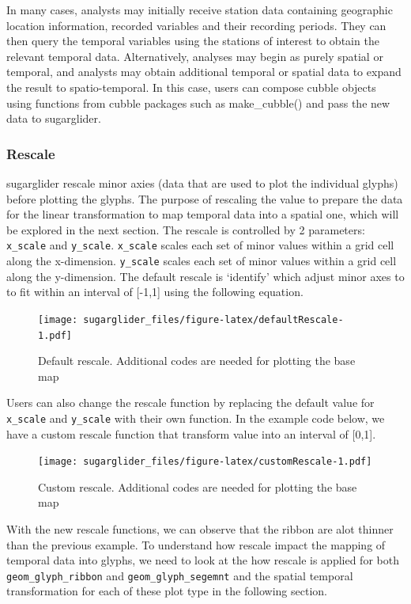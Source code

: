 In many cases, analysts may initially receive station data containing geographic location information, recorded variables and their recording periods. They can then query the temporal variables using the stations of interest to obtain the relevant temporal data. Alternatively, analyses may begin as purely spatial or temporal, and analysts may obtain additional temporal or spatial data to expand the result to spatio-temporal. In this case, users can compose cubble objects using functions from cubble packages such as make\_cubble() and pass the new data to sugarglider.

\hypertarget{rescale}{%
\subsubsection{Rescale}\label{rescale}}

sugarglider rescale minor axies (data that are used to plot the individual glyphs) before plotting the glyphs. The purpose of rescaling the value to prepare the data for the linear transformation to map temporal data into a spatial one, which will be explored in the next section. The rescale is controlled by 2 parameters: \texttt{x\_scale} and \texttt{y\_scale}. \texttt{x\_scale} scales each set of minor values within a grid cell along the x-dimension. \texttt{y\_scale} scales each set of minor values within a grid cell along the y-dimension. The default rescale is `identify' which adjust minor axes to to fit within an interval of {[}-1,1{]} using the following equation.

\begin{figure}
\centering
\texttt{[image: sugarglider\_files/figure-latex/defaultRescale-1.pdf]}
\caption{\label{fig:defaultRescale}Default rescale. Additional codes are needed for plotting the base map}
\end{figure}

Users can also change the rescale function by replacing the default value for \texttt{x\_scale} and \texttt{y\_scale} with their own function. In the example code below, we have a custom rescale function that transform value into an interval of {[}0,1{]}.

\begin{figure}
\centering
\texttt{[image: sugarglider\_files/figure-latex/customRescale-1.pdf]}
\caption{\label{fig:customRescale}Custom rescale. Additional codes are needed for plotting the base map}
\end{figure}

With the new rescale functions, we can observe that the ribbon are alot thinner than the previous example. To understand how rescale impact the mapping of temporal data into glyphs, we need to look at the how rescale is applied for both \texttt{geom\_glyph\_ribbon} and \texttt{geom\_glyph\_segemnt} and the spatial temporal transformation for each of these plot type in the following section.

